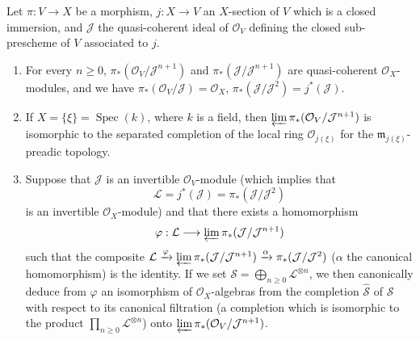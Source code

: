 \begin{lemma}[8.10.1]
\label{II.8.10.1}
Let $\pi:V\to X$ be a morphism, $j:X\to V$ an $X$-section of $V$ which is
a closed immersion, and $\mathcal{J}$ the quasi-coherent ideal of
$\mathcal{O}_V$ defining the closed sub-prescheme of $V$ associated to $j$.
\begin{enumerate}
  \item[\rm{(i)}] For every $n\geqslant 0$,
  $\pi_*(\mathcal{O}_V/\mathcal{J}^{n+1})$ and
  $\pi_*(\mathcal{J}/\mathcal{J}^{n+1})$ are quasi-coherent
  $\mathcal{O}_X$-modules, and we have
  $\pi_*(\mathcal{O}_V/\mathcal{J})=\mathcal{O}_X$,
  $\pi_*(\mathcal{J}/\mathcal{J}^2)=j^*(\mathcal{J})$.
  \item[\rm{(ii)}] If $X=\{\xi\}=\operatorname{Spec}(k)$, where $k$ is a
  field, then $\varprojlim\pi_*(\mathcal{O}_V/\mathcal{J}^{n+1})$ is
  isomorphic to the separated completion of the local ring
  $\mathcal{O}_{j(\xi)}$ for the $\mathfrak{m}_{j(\xi)}$-preadic topology.
  \item[\rm{(iii)}] Suppose that $\mathcal{J}$ is an invertible
  $\mathcal{O}_V$-module (which implies that
  \[
    \mathcal{L}=j^*(\mathcal{J})=
    \pi_*(\mathcal{J}/\mathcal{J}^2)
  \]
  is an invertible $\mathcal{O}_X$-module) and that there exists a
  homomorphism
  \[
    \varphi:\mathcal{L}\longrightarrow
    \varprojlim\pi_*(\mathcal{J}/\mathcal{J}^{n+1})
  \]
  such that the composite $\mathcal{L}\xrightarrow{\varphi}\varprojlim\pi_*(\mathcal{J}/\mathcal{J}^{n+1})\xrightarrow{\alpha}\pi_*(\mathcal{J}/\mathcal{J}^2)$
  ($\alpha$ the canonical homomorphism) is the identity. If we set
  $\mathcal{S}=\bigoplus_{n\geqslant0}\mathcal{L}^{\otimes n}$, we then
  canonically deduce from $\varphi$ an isomorphism of
  $\mathcal{O}_X$-algebras from the completion $\widehat{\mathcal{S}}$ of
  $\mathcal{S}$ with respect to its canonical filtration (a completion which
  is isomorphic to the product $\prod_{n\geqslant0}\mathcal{L}^{\otimes n}$)
  onto $\varprojlim\pi_*(\mathcal{O}_V/\mathcal{J}^{n+1})$.
\end{enumerate}
\end{lemma}


